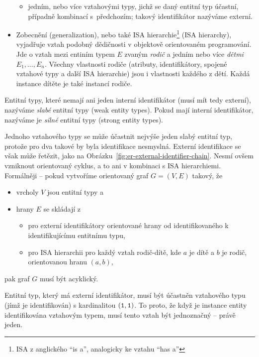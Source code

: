 \begin{itemize}
\begin{itemize}
          \item jedním, nebo více vztahovými typy, jichž se daný entitní typ účastní, případně kombinací s~předchozím; takový identifikátor nazýváme externí.
        \end{itemize}
  \item Zobecnění (generalization), nebo také ISA hierarchie\footnote{ISA z anglického \enquote{is a}, analogicky ke vztahu \enquote{has a}} (ISA hierarchy), vyjadřuje vztah podobný dědičnosti v objektově orientovaném programování.
        Jde o vztah mezi entiním typem $E$ zvaným \emph{rodič} a jedním nebo více \emph{dětmi} $E_1, \dots, E_n$.
        Všechny vlastnosti rodiče (atributy, identifikátory, spojené vztahové typy a další ISA hierarchie) jsou i vlastnosti každého z dětí.
        Každá instance dítěte je také instancí rodiče.
\end{itemize}

Entitní typy, které nemají ani jeden interní identifikátor (musí mít tedy externí), nazýváme \emph{slabé} entitní typy (weak entity types).
Pokud mají interní identifikátor, nazýváme je \emph{silné} entitní typy (strong entity types).

Jednoho vztahového typy se může účastnit nejvýše jeden slabý entitní typ, protože pro dva takové by byla identifikace nesmyslná.
Externí identifikace se však může řetězit, jako na Obrázku~\ref{fig:er-external-identifier-chain}.
Nesmí ovšem vzniknout orientovaný cyklus, a to ani v kombinaci s ISA hierarchiemi.
Formálněji -- pokud vytvoříme orientovaný graf $G=(V,E)$ takový, že
\begin{itemize}
  \item vrcholy $V$ jsou entitní typy a
  \item hrany $E$ se skládají z
        \begin{itemize}
          \item pro externí identifikátory orientované hrany od identifikovaného k identifikujícímu entitnímu typu,
          \item pro ISA hierarchii pro každý vztah rodič-dítě, kde $a$ je dítě a $b$ je rodič, orientovanou hranu $(a, b)$,
        \end{itemize}
\end{itemize}
pak graf $G$ musí být acyklický.

Entitní typ, který má externí identifikátor, musí být účastněn vztahového typu (jímž je identifikován) s kardinalitou $(\texttt{1},\texttt{1})$.
To proto, že když je instance entity identifikována vztahovým typem, musí tento vztah být jednoznačný -- právě jeden.

